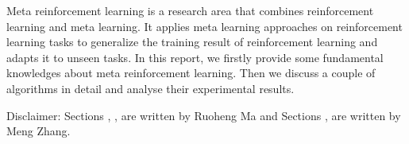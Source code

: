 Meta reinforcement learning is a research area that combines reinforcement learning and meta learning. It applies meta learning approaches on reinforcement learning tasks to generalize the training result of reinforcement learning and adapts it to unseen tasks. In this report, we firstly provide some fundamental knowledges about meta reinforcement learning. Then we discuss a couple of algorithms in detail and analyse their experimental results.\par
Disclaimer: {\normalfont Sections , ,  are written by Ruoheng Ma and Sections ,  are written by Meng Zhang.}